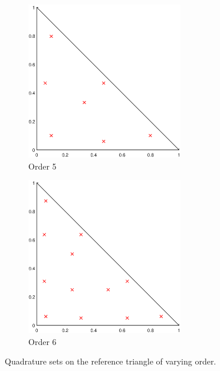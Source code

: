 \begin{figure}
{
	\begin{subfigure}[b]{0.475\textwidth}
		\centering
		\label{subfig::2DInt_RefTri_Q5}
		\includegraphics[width=0.75\textwidth]{figures/sec_BF/RefTriQuad_Q5.eps}
		\caption{Order 5}
	\end{subfigure}
	\hfill
	\begin{subfigure}[b]{0.475\textwidth}
		\centering
		\label{subfig::2DInt_RefTri_Q6}
		\includegraphics[width=0.75\textwidth]{figures/sec_BF/RefTriQuad_Q6.eps}
		\caption{Order 6}
	\end{subfigure}
}
\caption{Quadrature sets on the reference triangle of varying order.}
\label{fig::BF_2DIntegration_RefTri}
\end{figure}

